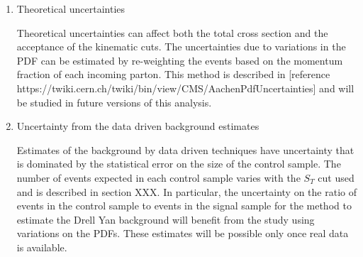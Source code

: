 \begin{enumerate}
\item Theoretical uncertainties 

Theoretical uncertainties can affect both the total cross section and the acceptance of the kinematic cuts.  
The uncertainties due to variations in the PDF can be estimated by re-weighting the events based on the momentum fraction of each incoming parton.  
This method is described in [reference https://twiki.cern.ch/twiki/bin/view/CMS/AachenPdfUncertainties] and will be studied in future versions of this analysis.

\item Uncertainty from the data driven background estimates

Estimates of the background by data driven techniques have uncertainty that is dominated by the statistical error on the size of the control sample.
The number of events expected in each control sample varies with the $S_T$ cut used and is described in section XXX.  
In particular, the uncertainty on the ratio of events in the control sample to events in the signal sample for the method to estimate the 
Drell Yan background will benefit from the study using variations on the PDFs.
These estimates will be possible only once real data is available.

\end{enumerate}
%

%
